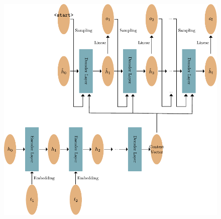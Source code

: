 \documentclass[]{marticle}
\begin{document}
\begin{figure}[] 
\begin{center}
\includegraphics{recurrent_context.pdf}
\caption{} 
\end{center}
\end{figure}
\end{document}
